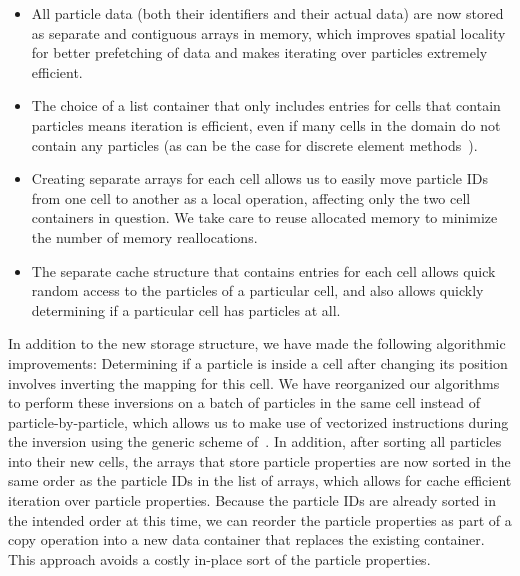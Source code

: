 \documentclass{ansarticle-preprint}
\begin{document}
\begin{itemize}
\item All particle data (both their identifiers and their actual data) are now stored as separate and contiguous arrays in memory, which improves spatial locality for better prefetching of data and makes iterating over particles extremely efficient.
\item The choice of a list container that only includes entries for cells that contain particles means iteration is efficient, even if many cells in the domain do not contain any particles (as can be the case for discrete element methods~\cite{golshan2022lethe}).
\item Creating separate arrays for each cell allows us to easily move particle IDs from one cell to another as a local operation, affecting only the two cell containers in question. We take care to reuse allocated memory to minimize the number of memory reallocations.
\item The separate cache structure that contains entries for each cell allows quick random access to the particles of a particular cell, and also allows quickly determining if a particular cell has particles at all.
\end{itemize}

In addition to the new storage structure, we have made the following algorithmic improvements:
Determining if a particle is inside a cell after changing its position involves inverting the mapping for this cell. We have reorganized our algorithms to perform these inversions on a batch of particles in the same cell instead of particle-by-particle, which allows us to make use of vectorized instructions during the inversion using the generic scheme of~\cite{KronbichlerKormann2012}.
In addition, after sorting all particles into their new cells, the arrays that store particle properties are now sorted in the same order as the particle IDs in the list of arrays, which allows for cache efficient iteration over particle properties.
Because the particle IDs are already sorted in the intended order at this time, we can reorder the particle properties as part of a copy operation into a new data container that replaces the existing container. This approach avoids a costly in-place sort of the particle properties.
\end{document}

